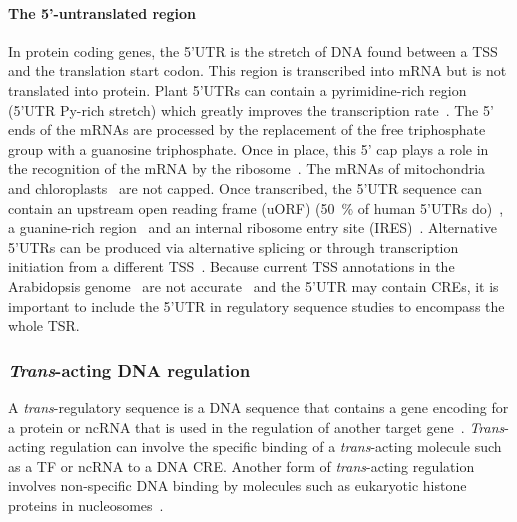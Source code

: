 \paragraph{The 5'-untranslated region}\label{the-5-untranslated-region}

In protein coding genes, the 5'UTR is the stretch of DNA found between a
TSS and the translation start codon. This region is transcribed into
mRNA but is not translated into protein. Plant 5'UTRs can contain a
pyrimidine\hyp{}rich region (5'UTR Py\hyp{}rich stretch) which greatly improves
the transcription rate~\autocite{choudhuryComparativeStudyCultivar2009,duIsolationFunctionalCharacterization2010,bianCloningExpressionCharacterization2011}.
The 5' ends of the mRNAs are
processed by the replacement of the free triphosphate group with a
guanosine triphosphate. Once in place, this 5' cap plays a role in the
recognition of the mRNA by the ribosome~\autocite{byszewskaRNAMethyltransferasesInvolved2014,ramanathanMRNACappingBiological2016}. The mRNAs of
mitochondria~\autocite{temperleyHumanMitochondrialMRNAs2010} and chloroplasts~\autocite{mondeProcessingDegradationChloroplast2000} are
not capped. Once transcribed, the 5'UTR sequence can contain an upstream
open reading frame (uORF) (\SI{50}{\percent} of human 5'UTRs do)~\autocite{calvoUpstreamOpenReading2009},
a guanine\hyp{}rich region~\autocite{beaudoinUTRGquadruplexStructures2010} and an internal ribosome entry
site (IRES)~\autocite{jimenez-gonzalezFunctionalStructuralAnalysis2014}.
Alternative 5'UTRs can be produced via alternative splicing or through
transcription initiation from a different TSS~\autocite{smithPosttranscriptionalRegulationGene2008}.
Because current TSS annotations in the Arabidopsis genome~\autocite{lameschArabidopsisInformationResource2012} are not accurate~\autocite{mortonPairedEndAnalysisTranscription2014,thieffryCharacterizationArabidopsisThaliana2020} and the 5'UTR may contain CREs, it is important to include the 5'UTR in regulatory sequence studies to encompass the whole TSR.

\subsubsection{\textit{Trans}-acting DNA regulation}\label{trans-acting-dna-regulation}

A \textit{trans}\hyp{}regulatory sequence is a DNA sequence that contains a
gene encoding for a protein or ncRNA that is used in the regulation of
another target gene~\autocite{watsonRecombinantDNAGenes2007}. \textit{Trans}\hyp{}acting regulation
can involve the specific binding of a \textit{trans}\hyp{}acting molecule such
as a TF or ncRNA to a DNA CRE. Another form of \textit{trans}\hyp{}acting
regulation involves non\hyp{}specific DNA binding by molecules such as
eukaryotic histone proteins in nucleosomes~\autocite{zhangIntrinsicHistoneDNAInteractions2009}.

